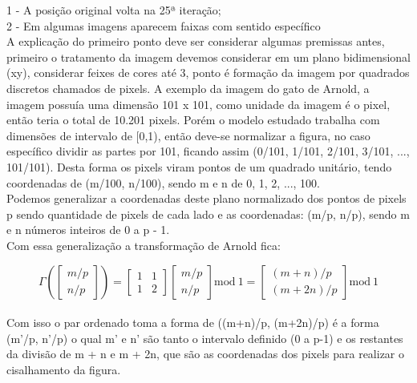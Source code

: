 \documentclass[a4paper, 12pt]{article}
\begin{document}
1 - A posição original volta na 25ª iteração;\\

2 - Em algumas imagens aparecem faixas com sentido específico\\

A explicação do primeiro ponto deve ser considerar algumas premissas antes, primeiro o tratamento da imagem devemos considerar em um plano bidimensional (xy), considerar feixes de cores até 3, ponto é formação da imagem por quadrados discretos chamados de pixels. A exemplo da imagem do gato de Arnold, a imagem possuía uma dimensão 101 x 101, como unidade da imagem é o pixel, então teria o total de 10.201 pixels. Porém o modelo estudado trabalha com dimensões de intervalo de [0,1), então deve-se normalizar a figura, no caso específico dividir as partes por 101, ficando assim (0/101, 1/101, 2/101, 3/101, ..., 101/101). Desta forma os pixels viram pontos de um quadrado unitário, tendo coordenadas de (m/100, n/100), sendo m e n de 0, 1, 2, ..., 100.\\

Podemos generalizar a coordenadas deste plano normalizado dos pontos de pixels p sendo quantidade de pixels de cada lado e as coordenadas: (m/p, n/p), sendo m e n números inteiros de 0 a p - 1.\\

Com essa generalização a transformação de Arnold fica:


$$\Gamma \left(\begin{bmatrix}
m/p\\
n/p
\end{bmatrix}\right)=\begin{bmatrix}
1&1\\
1&2
\end{bmatrix}\begin{bmatrix}
m/p\\
n/p
\end{bmatrix}\mathrm{mod\ 1}=\begin{bmatrix}
(m + n)/p\\
(m + 2n)/p
\end{bmatrix}\mathrm{mod\ 1}$$\\



Com isso o par ordenado toma a forma de ((m+n)/p, (m+2n)/p) é a forma (m'/p, n'/p) o qual m' e n' são tanto o intervalo definido (0 a p-1) e os restantes da divisão de m + n e m + 2n, que são as coordenadas dos pixels para realizar o cisalhamento da figura.\\
\end{document}
